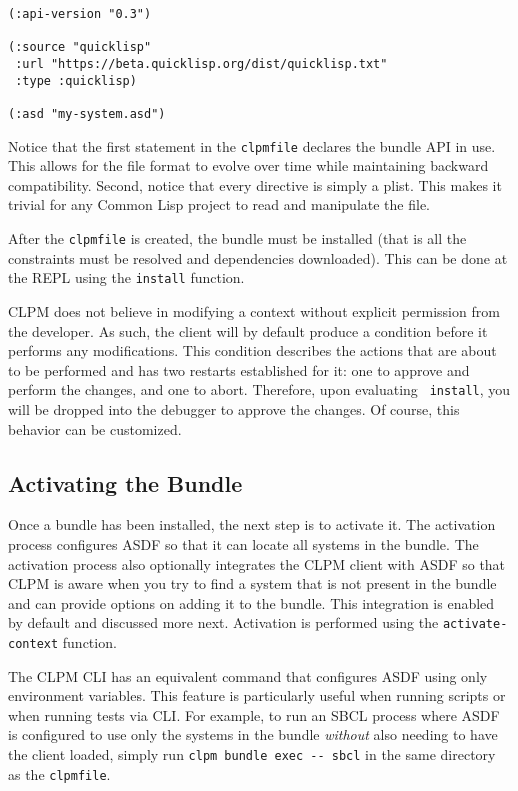 \documentclass[sigconf]{acmart}
\begin{document}
\begin{verbatim}
(:api-version "0.3")

(:source "quicklisp"
 :url "https://beta.quicklisp.org/dist/quicklisp.txt"
 :type :quicklisp)

(:asd "my-system.asd")
\end{verbatim}

Notice that the first statement in the {\tt clpmfile} declares the bundle API
in use. This allows for the file format to evolve over time while maintaining
backward compatibility. Second, notice that every directive is simply a
plist. This makes it trivial for any Common Lisp project to read and manipulate
the file.

After the {\tt clpmfile} is created, the bundle must be installed (that is all
the constraints must be resolved and dependencies downloaded). This can be done
at the REPL using the {\tt install} function.

CLPM does not believe in modifying a context without explicit permission from
the developer. As such, the client will by default produce a condition before
it performs any modifications. This condition describes the actions that are
about to be performed and has two restarts established for it: one to approve
and perform the changes, and one to abort. Therefore, upon evaluating {\tt
  install}, you will be dropped into the debugger to approve the changes. Of
course, this behavior can be customized.


\subsection{Activating the Bundle}

Once a bundle has been installed, the next step is to activate it. The
activation process configures ASDF so that it can locate all systems in the
bundle. The activation process also optionally integrates the CLPM client with
ASDF so that CLPM is aware when you try to find a system that is not present in
the bundle and can provide options on adding it to the bundle. This integration
is enabled by default and discussed more next. Activation is performed using
the {\tt activate-context} function.

The CLPM CLI has an equivalent command that configures ASDF using only
environment variables. This feature is particularly useful when running scripts
or when running tests via CLI. For example, to run an SBCL process where ASDF
is configured to use only the systems in the bundle {\it without} also needing
to have the client loaded, simply run {\tt clpm bundle exec -{}- sbcl} in the
same directory as the {\tt clpmfile}.
\end{document}
